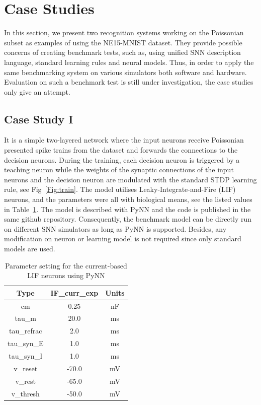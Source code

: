 \section{Case Studies}
\label{sec:test}
In this section, we present two recognition systems working on the Poissonian subset as examples of using the NE15-MNIST dataset.
They provide possible concerns of creating benchmark tests, such as, using unified SNN description language, standard learning rules and neural models.
Thus, in order to apply the same benchmarking system on various simulators both software and hardware.
Evaluation on such a benchmark test is still under investigation, the case studies only give an attempt.

\subsection{Case Study I}
It is a simple two-layered network where the input neurons receive Poissonian presented spike trains from the dataset and forwards the connections to the decision neurons.
During the training, each decision neuron is triggered by a teaching neuron while the weights of the synaptic connections of the input neurons and the decision neuron are modulated with the standard STDP learning rule, see Fig~\ref{Fig:train}.
The model utilises Leaky-Integrate-and-Fire (LIF) neurons, and the parameters were all with biological means, see the listed values in Table~\ref{tbl:pynnSetting}.
The model is described with PyNN and the code is published in the same github repository.
Consequently, the benchmark model can be directly run on different SNN simulators as long as PyNN is supported.
Besides, any modification on neuron or learning model is not required since only standard models are used.

\begin{table}[hbbp]
\centering
\caption{\label{tbl:pynnSetting}Parameter setting for the current-based LIF neurons using PyNN}
\begin{tabular}{c|c|c}
\hline
Type & IF\_curr\_exp & Units\\
\hline
cm & 0.25 & nF	\\
tau\_m & 20.0 & ms\\
tau\_refrac & 2.0 & ms\\
tau\_syn\_E & 1.0 & ms\\
tau\_syn\_I & 1.0 & ms\\
v\_reset & -70.0 & mV\\
v\_rest & -65.0 & mV\\
v\_thresh & -50.0 & mV\\
\hline
\end{tabular}
\end{table}

